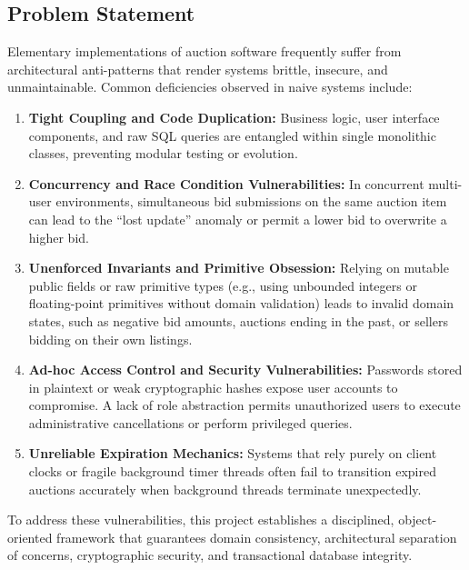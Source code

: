 \subsection{Problem Statement}
Elementary implementations of auction software frequently suffer from architectural anti-patterns that render systems brittle, insecure, and unmaintainable. Common deficiencies observed in naive systems include:
\begin{enumerate}
    \item \textbf{Tight Coupling and Code Duplication:} Business logic, user interface components, and raw SQL queries are entangled within single monolithic classes, preventing modular testing or evolution.
    \item \textbf{Concurrency and Race Condition Vulnerabilities:} In concurrent multi-user environments, simultaneous bid submissions on the same auction item can lead to the ``lost update'' anomaly or permit a lower bid to overwrite a higher bid.
    \item \textbf{Unenforced Invariants and Primitive Obsession:} Relying on mutable public fields or raw primitive types (e.g., using unbounded integers or floating-point primitives without domain validation) leads to invalid domain states, such as negative bid amounts, auctions ending in the past, or sellers bidding on their own listings.
    \item \textbf{Ad-hoc Access Control and Security Vulnerabilities:} Passwords stored in plaintext or weak cryptographic hashes expose user accounts to compromise. A lack of role abstraction permits unauthorized users to execute administrative cancellations or perform privileged queries.
    \item \textbf{Unreliable Expiration Mechanics:} Systems that rely purely on client clocks or fragile background timer threads often fail to transition expired auctions accurately when background threads terminate unexpectedly.
\end{enumerate}

To address these vulnerabilities, this project establishes a disciplined, object-oriented framework that guarantees domain consistency, architectural separation of concerns, cryptographic security, and transactional database integrity.

